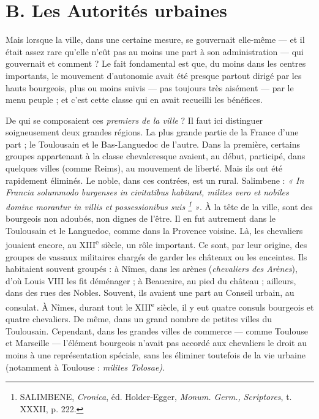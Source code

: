 \documentclass[french,twoside]{book} %
\begin{document}
\section[B. Les Autorités urbaines]{B. Les Autorités urbaines}
\label{c08b}
\noindent Mais lorsque la ville, dans une certaine mesure, se gouvernait elle-même — et il était assez rare qu’elle n’eût pas au moins une part à son administration — qui gouvernait et comment ? Le fait fondamental est que, du moins dans les centres importants, le mouvement d’autonomie avait été presque partout dirigé par les hauts bourgeois, plus ou moins suivis — pas toujours très aisément —  
\label{p74} par le menu peuple ; et c’est cette classe qui en avait recueilli les bénéfices.\par
De qui se composaient ces \emph{premiers de la ville} ? Il faut ici distinguer soigneusement deux grandes régions. La plus grande partie de la France d’une part ; le Toulousain et le Bas-Languedoc de l’autre. Dans la première, certains groupes appartenant à la classe chevaleresque avaient, au début, participé, dans quelques villes (comme Reims), au mouvement de liberté. Mais ils ont été rapidement éliminés. Le noble, dans ces contrées, est un rural. Salimbene : \emph{« In Francia solummodo burgenses in civitatibus habitant, milites vero et nobiles domine morantur in villis et possessionibus suis \footnote{ SALIMBENE, {\itshape Cronica}, éd. Holder-Egger, {\itshape Monum. Germ., Scriptores}, t. XXXII, p. 222.} »}. À la tête de la ville, sont des bourgeois non adoubés, non dignes de l’être. Il en fut autrement dans le Toulousain et le Languedoc, comme dans la Provence voisine. Là, les chevaliers jouaient encore, au XIII\textsuperscript{e} siècle, un rôle important. Ce sont, par leur origine, des groupes de vassaux militaires chargés de garder les châteaux ou les enceintes. Ils habitaient souvent groupés : à Nîmes, dans les arènes (\emph{chevaliers des Arènes}), d’où Louis VIII les fit déménager ; à Beaucaire, au pied du château ; ailleurs, dans des rues des Nobles. Souvent, ils avaient une part au Conseil urbain, au consulat. À Nîmes, durant tout le XIII\textsuperscript{e} siècle, il y eut quatre consuls bourgeois et quatre chevaliers. De même, dans un grand nombre de petites villes du Toulousain. Cependant, dans les grandes villes de commerce — comme Toulouse et Marseille — l’élément bourgeois n’avait pas accordé aux chevaliers le droit au moins à une représentation spéciale, sans les éliminer toutefois de la vie urbaine (notamment à Toulouse : {\itshape milites Tolosae).}\par
\end{document}
